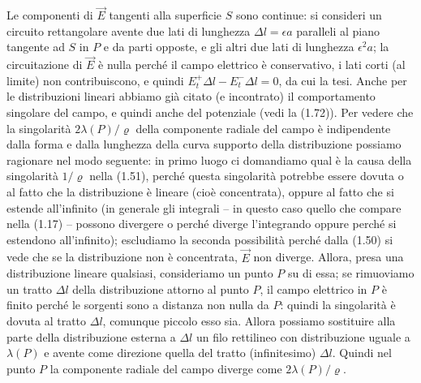 Le componenti di $\vec E$ tangenti alla superficie $S$ sono continue: si consideri un circuito rettangolare avente due lati di lunghezza $\Delta l=\epsilon a$ paralleli al piano tangente ad $S$ in $P$ e da parti opposte, e gli altri due lati di lunghezza $\epsilon^2a$; la circuitazione di $\vec E$ è nulla perché il campo elettrico è conservativo, i lati corti (al limite) non contribuiscono, e quindi $E_t^+\Delta l-E_t^-\Delta l=0$, da cui la tesi.
Anche per le distribuzioni lineari abbiamo già citato (e incontrato) il comportamento singolare del campo, e quindi anche del potenziale \big(vedi la (1.72)\big). Per vedere che la singolarità $2\lambda(P)/\varrho$ della componente radiale del campo è indipendente dalla forma e dalla lunghezza della curva supporto della distribuzione possiamo ragionare nel modo seguente: in primo luogo ci domandiamo qual è la causa della singolarità $1/\varrho$ nella (1.51), perché questa singolarità potrebbe essere dovuta o al fatto che la distribuzione è lineare (cioè concentrata), oppure al fatto che si estende all'infinito (in generale gli integrali -- in questo caso quello che compare nella (1.17) -- possono divergere o perché diverge l'integrando oppure perché si estendono all'infinito); escludiamo la seconda possibilità perché dalla (1.50) si vede che se la distribuzione non è concentrata, $\vec E$ non diverge. Allora, presa una distribuzione lineare qualsiasi, consideriamo un punto $P$ su di essa; se rimuoviamo un tratto $\Delta l$ della distribuzione attorno al punto $P$, il campo elettrico in $P$ è finito perché le sorgenti sono a distanza non nulla da $P$: quindi la singolarità è dovuta al tratto $\Delta l$, comunque piccolo esso sia. Allora possiamo sostituire alla parte della distribuzione esterna a $\Delta l$ un filo rettilineo con distribuzione uguale a $\lambda(P)$ e avente come direzione quella del tratto (infinitesimo) $\Delta l$. Quindi nel punto $P$ la componente radiale del campo diverge come $2\lambda(P)/\varrho$.

